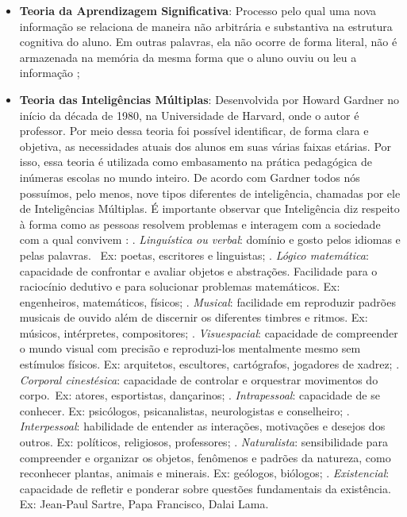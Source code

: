 \begin{itemize}
    \item \textbf{Teoria da Aprendizagem Significativa}: Processo pelo qual uma nova informação se relaciona de maneira não arbitrária e substantiva na estrutura cognitiva do aluno. Em outras palavras, ela não ocorre de forma literal, não é armazenada na memória da mesma forma que o aluno ouviu ou leu a informação \cite{Cilli2017, Ausubel1980};
    \item \textbf{Teoria das Inteligências Múltiplas}: Desenvolvida por Howard Gardner no início da década de 1980, na Universidade de Harvard, onde o autor é professor. Por meio dessa teoria foi possível identificar, de forma clara e objetiva, as necessidades atuais dos alunos em suas várias faixas etárias. Por isso, essa teoria é utilizada como embasamento na prática pedagógica de inúmeras escolas no mundo inteiro. De acordo com Gardner todos nós possuímos, pelo menos, nove tipos diferentes de inteligência, chamadas por ele de Inteligências Múltiplas. É importante observar que Inteligência diz respeito à forma como as pessoas resolvem problemas e interagem com a sociedade com a qual convivem \cite{Cilli2017, Gardner1995}:
    . \textit{Linguística ou verbal}: domínio e gosto pelos idiomas e pelas palavras.  Ex: poetas, escritores e linguistas;
    . \textit{Lógico matemática}:  capacidade de confrontar e avaliar objetos e abstrações. Facilidade para o raciocínio dedutivo e para solucionar problemas matemáticos. Ex: engenheiros, matemáticos, físicos;
    . \textit{Musical}: facilidade em reproduzir padrões musicais de ouvido além de discernir os diferentes timbres e ritmos. Ex: músicos, intérpretes, compositores;
    . \textit{Visuespacial}: capacidade de compreender o mundo visual com precisão e reproduzi-los mentalmente mesmo sem estímulos físicos. Ex: arquitetos, escultores, cartógrafos, jogadores de xadrez;
    . \textit{Corporal cinestésica}: capacidade de controlar e orquestrar movimentos do corpo. Ex: atores, esportistas, dançarinos;
    . \textit{Intrapessoal}: capacidade de se conhecer. Ex: psicólogos, psicanalistas, neurologistas e conselheiro;
    . \textit{Interpessoal}: habilidade de entender as interações, motivações e desejos dos outros. Ex: políticos, religiosos, professores;
    . \textit{Naturalista}: sensibilidade para compreender e organizar os objetos, fenômenos e padrões da natureza, como reconhecer plantas, animais e minerais. Ex: geólogos, biólogos;
    . \textit{Existencial}: capacidade de refletir e ponderar sobre questões fundamentais da existência. Ex: Jean-Paul Sartre, Papa Francisco, Dalai Lama. 
\end{itemize}

